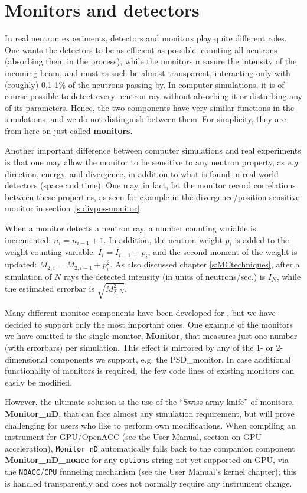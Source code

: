 \chapter{Monitors and detectors}

In real neutron experiments, detectors and monitors play quite
different roles. One wants the detectors to be as efficient as
possible, counting all neutrons (absorbing them in the process),
while the monitors measure the intensity of the incoming beam, and must
as such be almost transparent, interacting only with (roughly) 0.1-1\%
of the neutrons passing by. In computer simulations, it is
of course possible to detect every neutron ray without
absorbing it or disturbing any of its parameters. Hence, the two components
have very similar functions in the simulations, and we do
not distinguish between them. For simplicity, they are from here on
just called \textbf{monitors}.

Another important difference between computer simulations
and real experiments is
that one may allow the monitor to be sensitive to any neutron property,
as {\em e.g.} direction, energy, and divergence, in addition to what
is found in real-world detectors (space and time). One may, in
fact, let the monitor record correlations between these properties,
as seen for example in the divergence/position sensitive monitor in
section~\ref{s:divpos-monitor}.

When a monitor detects a neutron ray,
a number counting variable is incremented: $n_i = n_{i-1}+1$.
In addition, the neutron
weight $p_i$ is added to the weight counting variable:
$I_i = I_{i-1} + p_i$,
and the second moment of the weight is
updated: $M_{2,i} = M_{2,i-1} + p_i^2$.
As also discussed chapter \ref{s:MCtechniques}, after a simulation of $N$ rays
the detected intensity (in units of neutrons/sec.) is $I_N$,
while the estimated errorbar is $\sqrt{M_{2,N}^2}$.

Many different monitor components have been developed for
\MCS , but we have decided to support only the most important ones.
One example of the monitors we have omitted is the single monitor,
\textbf{Monitor},
that measures just one number (with errorbars) per simulation.
This effect is mirrored by any of the 1- or 2-dimensional components
we support, e.g. the \textrm{PSD\_monitor}.
In case additional functionality of monitors is required,
the few code lines of existing monitors can easily be modified.

However, the ultimate solution is the use of the
``Swiss army knife'' of monitors, \textbf{Monitor\_nD}, that can face
almost any simulation requirement,
but will prove challenging for users who like to perform own modifications.
When compiling an instrument for GPU/OpenACC (see the User Manual, section
on GPU acceleration), \texttt{Monitor\_nD} automatically falls back to the
companion component \textbf{Monitor\_nD\_noacc} for any \texttt{options}
string not yet supported on GPU, via the \texttt{NOACC}/\texttt{CPU}
funneling mechanism (see the User Manual's kernel chapter); this is
handled transparently and does not normally require any instrument change.

